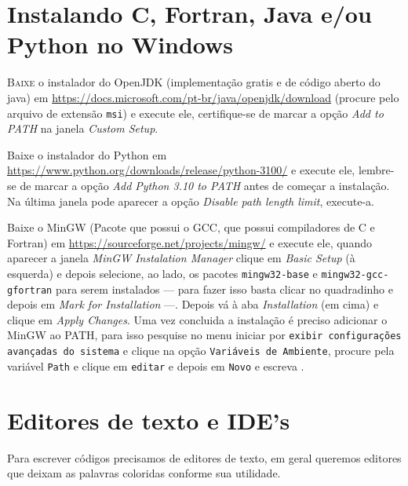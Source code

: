 \chapter{Instalando C, Fortran, Java e/ou Python no Windows}

\lettrine{B}{aixe} o instalador do OpenJDK (implementação gratis e de código aberto do java)
em
\url{https://docs.microsoft.com/pt-br/java/openjdk/download}
(procure pelo arquivo de extensão \texttt{msi})
e execute ele, certifique-se de marcar a opção \textit{Add to PATH} na
janela \textit{Custom Setup}.

Baixe o instalador do Python em
\url{https://www.python.org/downloads/release/python-3100/}
e execute ele, lembre-se de marcar a opção \textit{Add Python 3.10 to PATH}
antes de começar a instalação.
Na última janela pode aparecer a opção \textit{Disable path length limit},
execute-a.

Baixe o MinGW (Pacote que possui o GCC, que possui compiladores de C e Fortran)
em
\url{https://sourceforge.net/projects/mingw/}
e execute ele,
quando aparecer a janela \textit{MinGW Instalation Manager}
clique em \textit{Basic Setup} (à esquerda) e depois selecione, ao lado,
os pacotes \texttt{mingw32-base} e \texttt{mingw32-gcc-gfortran}
para serem instalados --- para fazer isso basta clicar no quadradinho e
depois em \textit{Mark for Installation} ---.
Depois vá à aba \textit{Installation} (em cima) e clique em \textit{Apply Changes}.
Uma vez concluida a instalação é preciso adicionar o MinGW ao PATH,
para isso pesquise no menu iniciar por
\texttt{exibir configurações avançadas do sistema} e clique na opção
\texttt{Variáveis de Ambiente}, procure pela variável \texttt{Path}
e clique em \texttt{editar} e depois em \texttt{Novo}
e escreva .


\chapter{Editores de texto e IDE's}

Para escrever códigos precisamos de editores de texto, em geral
queremos editores que deixam as palavras coloridas conforme sua utilidade.

